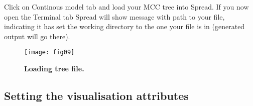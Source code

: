 Click on Continous model tab and load your MCC tree into Spread. If
you now open the Terminal tab Spread will show message with path to
your file, indicating it has set the working directory to the one
your file is in (generated output will go there).

\begin{figure}[H]
\begin{centering}
\texttt{[image: fig09]}
\caption{
{ \footnotesize 
{\bf Loading tree file.}
} %
}
\label{fig:09}
\par\end{centering}
\end{figure}

\subsection{Setting the visualisation attributes}

